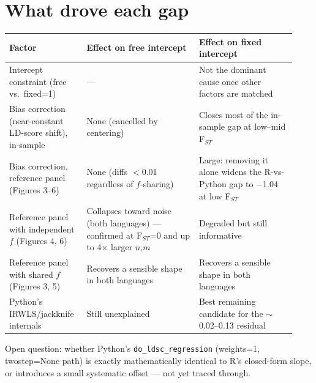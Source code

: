 \documentclass[10pt]{article}
\begin{document}
\section*{What drove each gap}
\small
\renewcommand{\arraystretch}{1.2}
\noindent\begin{tabular}{p{0.24\linewidth} p{0.37\linewidth} p{0.32\linewidth}}
\toprule
\textbf{Factor} & \textbf{Effect on free intercept} & \textbf{Effect on fixed intercept} \\
\midrule
Intercept constraint (free vs.\ fixed=1) & --- & Not the dominant cause once other factors are matched \\
Bias correction (near-constant LD-score shift), in-sample & None (cancelled by centering) & Closes most of the in-sample gap at low--mid F$_{ST}$ \\
Bias correction, reference panel (Figures 3--6) & None (diffs $<$0.01 regardless of $f$-sharing) & Large: removing it alone widens the R-vs-Python gap to $-$1.04 at low F$_{ST}$ \\
Reference panel with independent $f$ (Figures 4, 6) & Collapses toward noise (both languages) --- confirmed at F$_{ST}$=0 and up to 4$\times$ larger $n$,$m$ & Degraded but still informative \\
Reference panel with shared $f$ (Figures 3, 5) & Recovers a sensible shape in both languages & Recovers a sensible shape in both languages \\
Python's IRWLS/jackknife internals & Still unexplained & Best remaining candidate for the $\sim$0.02--0.13 residual \\
\bottomrule
\end{tabular}
\normalsize

{\footnotesize\color{muted} Open question: whether Python's \texttt{do\_ldsc\_regression} (weights=1, twostep=None path) is exactly mathematically identical to R's closed-form slope, or introduces a small systematic offset --- not yet traced through.}
\end{document}
